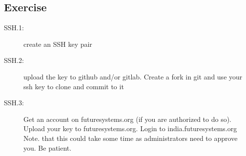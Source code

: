 
\subsection{Exercise}\label{exercise}

\begin{description}
\item[SSH.1:]
create an SSH key pair
\item[SSH.2:]
upload the key to github and/or gitlab. Create a fork in git and use
your ssh key to clone and commit to it
\item[SSH.3:]
Get an account on futuresystems.org (if you are authorized to do so).
Upload your key to futuresystems.org. Login to india.futuresystems.org
Note. that this could take some time as administrators need to approve
you. Be patient.
\end{description}
